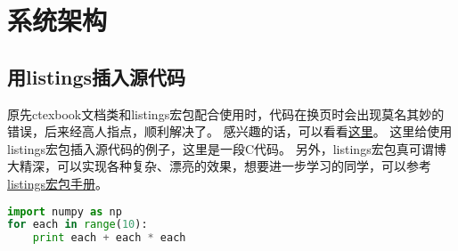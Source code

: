 

\chapter{系统架构}
\label{chap:archi}

\section{用listings插入源代码}

原先ctexbook文档类和listings宏包配合使用时，代码在换页时会出现莫名其妙的错误，后来经高人指点，顺利解决了。
感兴趣的话，可以看看\href{http://bbs.ctex.org/viewthread.php?tid=53451}{这里}。
这里给使用listings宏包插入源代码的例子，这里是一段C代码。
另外，listings宏包真可谓博大精深，可以实现各种复杂、漂亮的效果，想要进一步学习的同学，可以参考
\href{http://mirror.ctan.org/macros/latex/contrib/listings/listings.pdf}{listings宏包手册}。
\begin{lstlisting}[language={Python}, caption={一段Python源代码}]
import numpy as np
for each in range(10):
	print each + each * each

\end{lstlisting}

